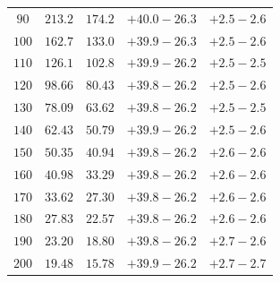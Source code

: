\begin{table}
\begin{center}
\begin{tabular}{ccccc}
$90  $&$ 213.2  $&$ 174.2  $&$ +40.0 -\!26.3  $&$ +2.5 -\!2.6  $\\
$100 $&$ 162.7  $&$ 133.0  $&$ +39.9 -\!26.3  $&$ +2.5 -\!2.6  $\\
$110 $&$ 126.1  $&$ 102.8  $&$ +39.9 -\!26.2  $&$ +2.5 -\!2.5  $\\
$120 $&$ 98.66  $&$ 80.43  $&$ +39.8 -\!26.2  $&$ +2.5 -\!2.6  $\\
$130 $&$ 78.09  $&$ 63.62  $&$ +39.8 -\!26.2  $&$ +2.5 -\!2.5  $\\
$140 $&$ 62.43  $&$ 50.79  $&$ +39.9 -\!26.2  $&$ +2.5 -\!2.6  $\\
$150 $&$ 50.35  $&$ 40.94  $&$ +39.8 -\!26.2  $&$ +2.6 -\!2.6  $\\
$160 $&$ 40.98  $&$ 33.29  $&$ +39.8 -\!26.2  $&$ +2.6 -\!2.6  $\\
$170 $&$ 33.62  $&$ 27.30  $&$ +39.8 -\!26.2  $&$ +2.6 -\!2.6  $\\
$180 $&$ 27.83  $&$ 22.57  $&$ +39.8 -\!26.2  $&$ +2.6 -\!2.6  $\\
$190 $&$ 23.20  $&$ 18.80  $&$ +39.8 -\!26.2  $&$ +2.7 -\!2.6  $\\
$200 $&$ 19.48  $&$ 15.78  $&$ +39.9 -\!26.2  $&$ +2.7 -\!2.7  $\\ \hline

  \end{tabular}
  \end{center}
\end{table}

